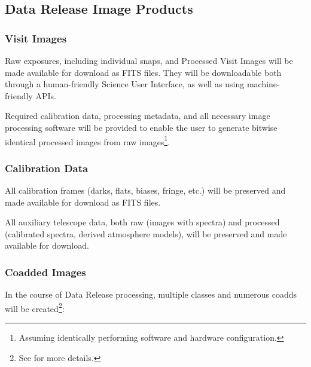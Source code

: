 \documentclass[SE,lsstdraft,toc]{lsstdoc}
\begin{document}
\subsection{Data Release Image Products}

\subsubsection{Visit Images}


Raw exposures, including individual snaps, and Processed Visit Images will be made available for download as FITS files. They will be downloadable both through a human-friendly Science User Interface, as well as using machine-friendly APIs.

Required calibration data, processing metadata, and all necessary image processing software will be provided to enable the user to generate bitwise identical processed images from raw images\footnote{Assuming identically performing software and hardware configuration.}.

\subsubsection{Calibration Data}

All calibration frames (darks, flats, biases, fringe, etc.) will be preserved and made available for download as FITS files.

All auxiliary telescope data, both raw (images with spectra) and processed (calibrated spectra, derived atmosphere models), will be preserved and made available for download.

\subsubsection{Coadded Images}
\label{sec:coadds}

In the course of Data Release processing, multiple classes and numerous coadds will be created\footnote{See  for more details.}:
\end{document}
